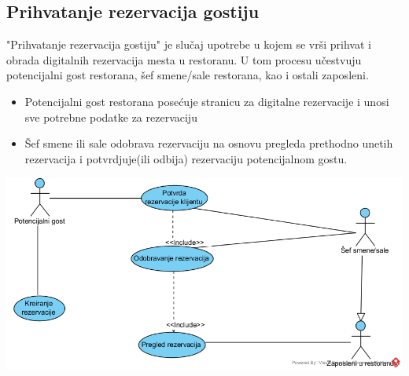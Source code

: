 \documentclass{article}
\begin{document}

\subsection{Prihvatanje rezervacija gostiju}
"Prihvatanje rezervacija gostiju" je slučaj upotrebe u kojem se vrši prihvat i obrada digitalnih rezervacija mesta u restoranu. U tom procesu učestvuju potencijalni gost restorana, šef smene/sale restorana, kao i ostali zaposleni.

\begin{itemize}
\item Potencijalni gost restorana posećuje stranicu za digitalne rezervacije i unosi sve potrebne podatke za rezervaciju
\item Šef smene ili sale odobrava rezervaciju na osnovu pregleda prethodno unetih rezervacija i potvrdjuje(ili odbija) rezervaciju potencijalnom gostu.
\end{itemize}
\vspace{1cm}
\includegraphics[width=\textwidth]{SU_5_prihvatanje_rezervacija.png}
\end{document}
